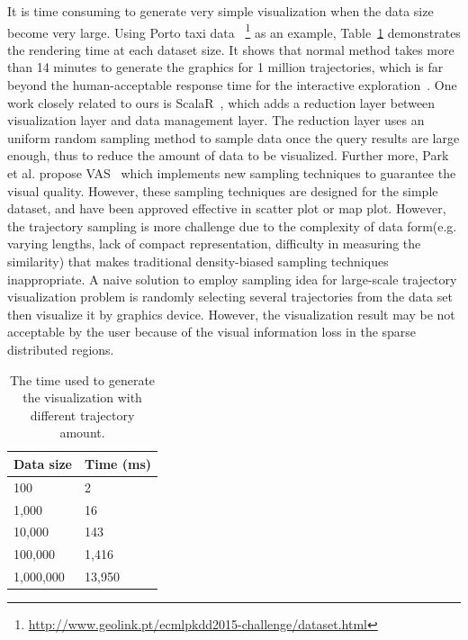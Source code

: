 It is time consuming to generate very simple visualization when the data size become very large. Using Porto taxi data ~\footnote{\url{http://www.geolink.pt/ecmlpkdd2015-challenge/dataset.html}} as an example, Table~\ref{table:rendering_time} demonstrates the rendering time at each dataset size. It shows that normal method takes more than 14 minutes to generate the graphics for 1 million trajectories, which is far beyond the human-acceptable response time for the interactive exploration~\cite{shneiderman1984response}.
One work closely related to ours is ScalaR~\cite{battle2013dynamic}, which adds a reduction layer between visualization layer and data management layer. The reduction layer uses an uniform random sampling method to sample data once the query results are large enough, thus to reduce the amount of data to be visualized.
Further more, Park et al. propose VAS~\cite{park2016visualization} which implements new sampling techniques to guarantee the visual quality. However, these sampling techniques are designed for the simple dataset, and have been approved effective in scatter plot or map plot. However, the trajectory sampling is more challenge due to the complexity of data form(e.g. varying lengths, lack of compact representation, difficulty in measuring the similarity) that makes traditional density-biased sampling techniques inappropriate. 
A naive solution to employ sampling idea for large-scale trajectory visualization problem is randomly selecting several trajectories from the data set then visualize it by graphics device.
However, the visualization result may be not acceptable by the user because of the visual information loss in the sparse distributed regions.


\begin{table}[h!]
	\centering
	\caption{The time used to generate the visualization with different trajectory amount. }
	\begin{tabular}{m{2.5cm}|m{2.5cm}} 
		\hline
		   Data size & Time (ms) \\ 
		\hline
		100& 2\\
		\hline
		1,000& 16\\
		\hline
		10,000& 143\\
		\hline
		100,000& 1,416\\
		\hline
		1,000,000& 13,950\\
		\hline
	\end{tabular}
	\label{table:rendering_time}
\end{table}


%





